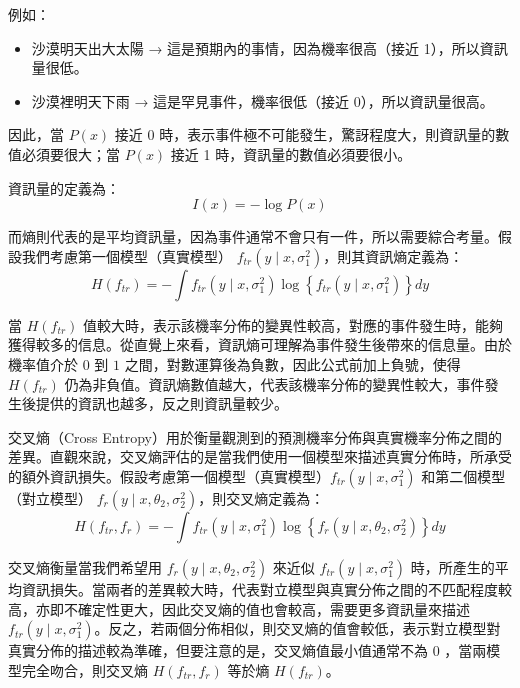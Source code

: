 例如：
\begin{itemize}
\item 沙漠明天出大太陽 → 這是預期內的事情，因為機率很高（接近 1），所以資訊量很低。
\item 沙漠裡明天下雨 → 這是罕見事件，機率很低（接近 0），所以資訊量很高。
\end{itemize}

\hspace*{8mm} 因此，當 $P(x)$ 接近 0 時，表示事件極不可能發生，驚訝程度大，則資訊量的數值必須要很大；當 $P(x)$ 接近 1 時，資訊量的數值必須要很小。

資訊量的定義為：
\begin{equation}\label{eq:information content}
I(x)=-\log P(x)
\end{equation}

\hspace*{8mm} 而熵則代表的是平均資訊量，因為事件通常不會只有一件，所以需要綜合考量。假設我們考慮第一個模型（真實模型） $f_{tr}(y \mid x, \sigma^2_1)$，則其資訊熵定義為：
\begin{equation}\label{eq:information entropy}
H(f_{tr}) = -\int f_{tr}(y \mid x, \sigma^2_1) \log \left\{f_{tr}(y \mid x, \sigma^2_1)\right\} dy
\end{equation}

\hspace*{8mm} 當 $H(f_{tr})$ 值較大時，表示該機率分佈的變異性較高，對應的事件發生時，能夠獲得較多的信息。從直覺上來看，資訊熵可理解為事件發生後帶來的信息量。由於機率值介於 $0$ 到 $1$ 之間，對數運算後為負數，因此公式前加上負號，使得 $H(f_{tr})$ 仍為非負值。資訊熵數值越大，代表該機率分佈的變異性較大，事件發生後提供的資訊也越多，反之則資訊量較少。

\hspace*{8mm} 交叉熵（Cross Entropy）用於衡量觀測到的預測機率分佈與真實機率分佈之間的差異。直觀來說，交叉熵評估的是當我們使用一個模型來描述真實分佈時，所承受的額外資訊損失。假設考慮第一個模型（真實模型）$f_{tr}(y \mid x, \sigma^2_1)$ 和第二個模型（對立模型） $f_r(y \mid x, \theta_2,\sigma^2_2)$，則交叉熵定義為：
\begin{equation}\label{eq:cross entropy}
H(f_{tr},f_r) = -\int f_{tr}(y \mid x, \sigma^2_1) \log \left\{f_r(y \mid x, \theta_2,\sigma^2_2)\right\} dy
\end{equation}

\hspace*{8mm} 交叉熵衡量當我們希望用 $f_r(y \mid x, \theta_2,\sigma^2_2)$ 來近似 $f_{tr}(y \mid x, \sigma^2_1)$ 時，所產生的平均資訊損失。當兩者的差異較大時，代表對立模型與真實分佈之間的不匹配程度較高，亦即不確定性更大，因此交叉熵的值也會較高，需要更多資訊量來描述 $f_{tr}(y \mid x, \sigma^2_1)$。反之，若兩個分佈相似，則交叉熵的值會較低，表示對立模型對真實分佈的描述較為準確，但要注意的是，交叉熵值最小值通常不為 $0$ ，當兩模型完全吻合，則交叉熵 $H(f_{tr},f_r)$ 等於熵 $H(f_{tr})$。

